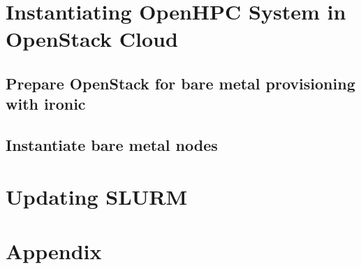 \documentclass[letterpaper]{article}
\begin{document}





\vspace*{-0.15cm}
\vspace*{-0.50cm}

\clearpage
\section{Instantiating OpenHPC System in OpenStack Cloud}

	
\clearpage
\subsection{Prepare OpenStack for bare metal provisioning with ironic} \label{sec:o-s_prep-ironic}


\vspace*{-0.15cm}
\newpage
\subsection{Instantiate bare metal nodes} \label{sec:instantiate-bare-metal}


\section{Updating SLURM}

	
\newpage
\section{Appendix}



	

\end{document}
